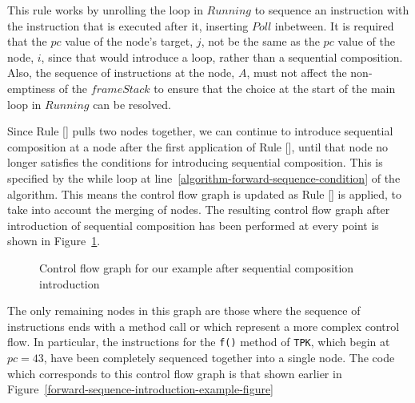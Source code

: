 This rule works by unrolling the loop in $Running$ to sequence an
instruction with the instruction that is executed after it, inserting
$Poll$ inbetween.
It is required that the $pc$ value of the node's target, $j$, not be
the same as the $pc$ value of the node, $i$, since that would
introduce a loop, rather than a sequential composition.
Also, the sequence of instructions at the node, $A$, must not affect
the non-emptiness of the $frameStack$ to ensure that the choice at the
start of the main loop in $Running$ can be resolved.

Since Rule [] pulls two nodes
together, we can continue to introduce sequential composition at a
node after the first application of
Rule [], until that node no longer
satisfies the conditions for introducing sequential composition.
This is specified by the while loop at
line~\ref{algorithm-forward-sequence-condition} of the algorithm.
This means the control flow graph is updated as
Rule [] is applied, to take into
account the merging of nodes.
The resulting control flow graph after introduction of sequential
composition has been performed at every point is shown in
Figure~\ref{example-control-flow-graph-after-sequence-introduction-figure}.
\begin{figure}
  \begin{center}
  \end{center}
  \caption{Control flow graph for our example after sequential composition introduction}
  \label{example-control-flow-graph-after-sequence-introduction-figure}
\end{figure}
The only remaining nodes in this graph are those where the sequence of
instructions ends with a method call or which represent a more complex
control flow.
In particular, the instructions for the \texttt{f()} method of
\texttt{TPK}, which begin at $pc = 43$, have been completely sequenced
together into a single node.
The code which corresponds to this control flow graph is that shown
earlier in Figure~\ref{forward-sequence-introduction-example-figure}

